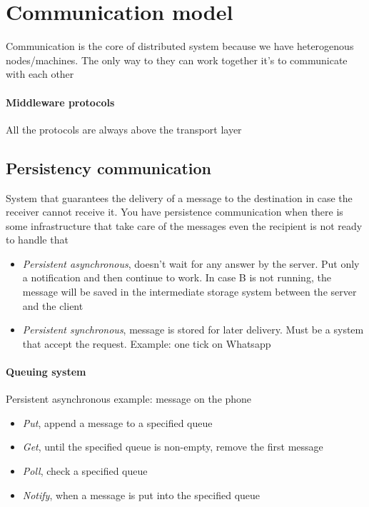 \section{Communication model}
Communication is the core of distributed system because we have heterogenous nodes/machines.
The only way to they can work together it’s to communicate with each other

\paragraph{Middleware protocols}
All the protocols are always above the transport layer

\subsection{Persistency communication}
System that guarantees the delivery of a message to the destination in case the receiver cannot receive it. You have persistence communication when there is some infrastructure that take care of the messages even the recipient is not ready to handle that

\begin{itemize}
    \item \textit{Persistent asynchronous}, doesn’t wait for any answer by the server. Put only a notification and then continue to work. In case B is not running, the message will be saved in the intermediate storage system between the server and the client
    \item \textit{Persistent synchronous}, message is stored for later delivery. Must be a system that accept the request. Example: one tick on Whatsapp
\end{itemize}

\paragraph{Queuing system}
Persistent asynchronous example: message on the phone
\begin{itemize}
    \item \textit{Put}, append a message to a specified queue
    \item \textit{Get}, until the specified queue is non-empty, remove the first message
    \item \textit{Poll}, check a specified queue
    \item \textit{Notify}, when a message is put into the specified queue
\end{itemize}

